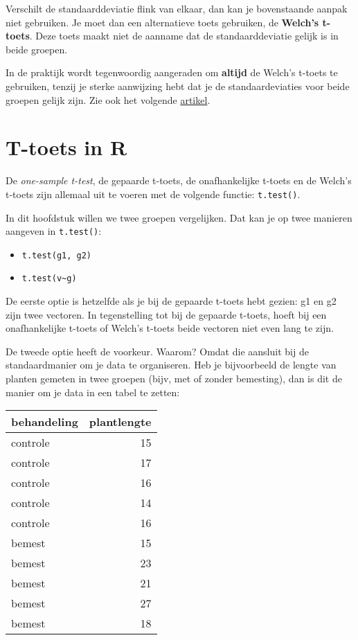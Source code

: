 \documentclass[]{book}
\providecommand{\tightlist}{%
  \setlength{\itemsep}{0pt}\setlength{\parskip}{0pt}}
\theoremstyle{definition}
\theoremstyle{definition}
\theoremstyle{definition}
\theoremstyle{remark}
\begin{document}
Verschilt de standaarddeviatie flink van elkaar, dan kan je bovenstaande
aanpak niet gebruiken. Je moet dan een alternatieve toets gebruiken, de
\textbf{Welch's t-toets}. Deze toets maakt niet de aanname dat de
standaarddeviatie gelijk is in beide groepen.

In de praktijk wordt tegenwoordig aangeraden om \textbf{altijd} de
Welch's t-toets te gebruiken, tenzij je sterke aanwijzing hebt dat je de
standaardeviaties voor beide groepen gelijk zijn. Zie ook het volgende
\href{https://academic.oup.com/beheco/article/17/4/688/215960}{artikel}.

\section{T-toets in R}\label{t-toets-in-r}

De \emph{one-sample t-test}, de gepaarde t-toets, de onafhankelijke
t-toets en de Welch's t-toets zijn allemaal uit te voeren met de
volgende functie: \texttt{t.test()}.

In dit hoofdstuk willen we twee groepen vergelijken. Dat kan je op twee
manieren aangeven in \texttt{t.test()}:

\begin{itemize}
\tightlist
\item
  \texttt{t.test(g1,\ g2)}
\item
  \texttt{t.test(v\textasciitilde{}g)}
\end{itemize}

De eerste optie is hetzelfde als je bij de gepaarde t-toets hebt gezien:
g1 en g2 zijn twee vectoren. In tegenstelling tot bij de gepaarde
t-toets, hoeft bij een onafhankelijke t-toets of Welch's t-toets beide
vectoren niet even lang te zijn.

De tweede optie heeft de voorkeur. Waarom? Omdat die aansluit bij de
standaardmanier om je data te organiseren. Heb je bijvoorbeeld de lengte
van planten gemeten in twee groepen (bijv, met of zonder bemesting), dan
is dit de manier om je data in een tabel te zetten:

\begin{tabular}{l|r}
\hline
behandeling & plantlengte\\
\hline
controle & 15\\
\hline
controle & 17\\
\hline
controle & 16\\
\hline
controle & 14\\
\hline
controle & 16\\
\hline
bemest & 15\\
\hline
bemest & 23\\
\hline
bemest & 21\\
\hline
bemest & 27\\
\hline
bemest & 18\\
\hline
\end{tabular}
\end{document}
